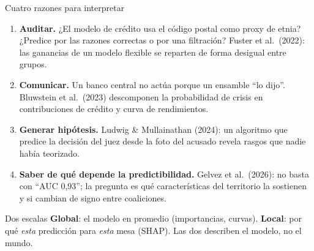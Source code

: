 \documentclass{beamer}
\newcommand{\1}{\mathbb{I}}
\begin{document}
\begin{frame}{Cuatro razones para interpretar}
\small
\begin{enumerate}\itemsep3pt
  \item \textbf{Auditar.} ¿El modelo de crédito usa el código postal como proxy de etnia? ¿Predice por las razones correctas o por una filtración? Fuster et al.\ (2022): las ganancias de un modelo flexible se reparten de forma desigual entre grupos. \pause
  \item \textbf{Comunicar.} Un banco central no actúa porque un ensamble ``lo dijo''. Bluwstein et al.\ (2023) descomponen la probabilidad de crisis en contribuciones de crédito y curva de rendimientos. \pause
  \item \textbf{Generar hipótesis.} Ludwig \& Mullainathan (2024): un algoritmo que predice la decisión del juez desde la foto del acusado revela rasgos que nadie había teorizado. \pause
  \item \textbf{Saber de qué depende la predictibilidad.} Gelvez et al.\ (2026): no basta con ``AUC 0,93''; la pregunta es qué características del territorio la sostienen y si cambian de signo entre coaliciones.
\end{enumerate}
\pause
\begin{block}{Dos escalas}
\textbf{Global}: el modelo en promedio (importancias, curvas). \textbf{Local}: por qué \emph{esta} predicción para \emph{esta} mesa (SHAP). Las dos describen el modelo, no el mundo.
\end{block}
\end{frame}
\end{document}

